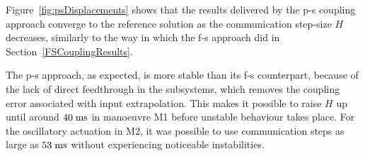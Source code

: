 \documentclass[fleqn,11pt]{article}
\newcommand{\unit}[1]		{ {\; \rm #1} }
\begin{document}
Figure~\ref{fig:psDisplacements} shows that the results delivered by the p-s coupling approach converge to the reference solution as the communication step-size $H$ decreases, similarly to the way in which the f-s approach did in Section~\ref{FSCouplingResults}.

The p-s approach, as expected, is more stable than its f-s counterpart, because of the lack of direct feedthrough in the subsystems, which removes the coupling error associated with input extrapolation.
This makes it possible to raise $H$ up until around $40\unit{ms}$ in manoeuvre M1 before unstable behaviour takes place.
For the oscillatory actuation in M2, it was possible to use communication steps as large as $53\unit{ms}$ without experiencing noticeable instabilities.


\pagebreak
\pagestyle{bib}

\end{document}
